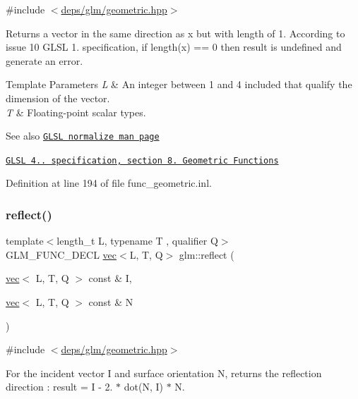 {\ttfamily \#include $<$\hyperlink{geometric_8hpp}{deps/glm/geometric.\+hpp}$>$}

Returns a vector in the same direction as x but with length of 1. According to issue 10 G\+L\+SL 1. specification, if length(x) == 0 then result is undefined and generate an error.


\begin{DoxyTemplParams}{Template Parameters}
{\em L} & An integer between 1 and 4 included that qualify the dimension of the vector. \\
\hline
{\em T} & Floating-\/point scalar types.\\
\hline
\end{DoxyTemplParams}
\begin{DoxySeeAlso}{See also}
\href{http://www.opengl.org/sdk/docs/manglsl/xhtml/normalize.xml}{\tt G\+L\+SL normalize man page} 

\href{http://www.opengl.org/registry/doc/GLSLangSpec.4.20.8.pdf}{\tt G\+L\+SL 4.. specification, section 8. Geometric Functions} 
\end{DoxySeeAlso}


Definition at line 194 of file func\+\_\+geometric.\+inl.

\mbox{\label{group__core__func__geometric_ga5631dd1d5618de5450b1ea3cf3e94905}} 
\subsubsection{\texorpdfstring{reflect()}{reflect()}}
{\footnotesize\ttfamily template$<$length\+\_\+t L, typename T , qualifier Q$>$ \\
G\+L\+M\+\_\+\+F\+U\+N\+C\+\_\+\+D\+E\+CL \hyperlink{structglm_1_1vec}{vec}$<$L, T, Q$>$ glm\+::reflect (\begin{DoxyParamCaption}\item[{\hyperlink{structglm_1_1vec}{vec}$<$ L, T, Q $>$ const \&}]{I,  }\item[{\hyperlink{structglm_1_1vec}{vec}$<$ L, T, Q $>$ const \&}]{N }\end{DoxyParamCaption})}



{\ttfamily \#include $<$\hyperlink{geometric_8hpp}{deps/glm/geometric.\+hpp}$>$}

For the incident vector I and surface orientation N, returns the reflection direction \+: result = I -\/ 2. $\ast$ dot(\+N, I) $\ast$ N.



